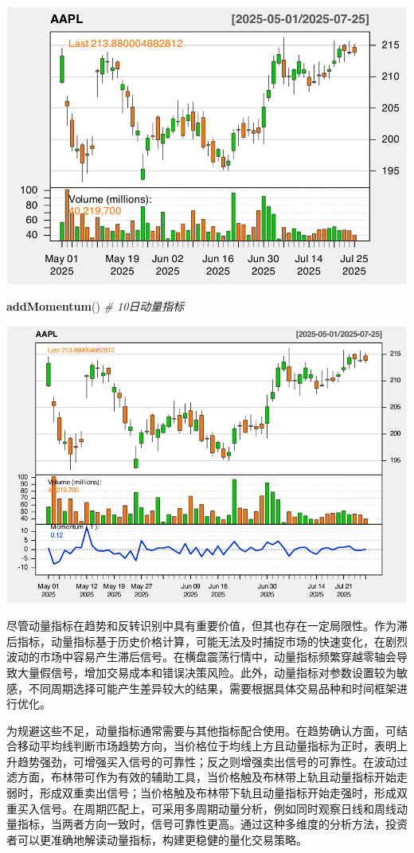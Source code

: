\documentclass[]{ctexbook}
\newenvironment{Shaded}{\begin{snugshade}}{\end{snugshade}}
\newcommand{\CommentTok}[1]{\textcolor[rgb]{0.56,0.35,0.01}{\textit{#1}}}
\newcommand{\FunctionTok}[1]{\textcolor[rgb]{0.13,0.29,0.53}{\textbf{#1}}}
\newcommand{\NormalTok}[1]{#1}
\begin{document}
\includegraphics[width=0.9\linewidth]{QuantmodHandbook_files/figure-latex/mom-1}

\begin{Shaded}
\begin{Highlighting}[]
\FunctionTok{addMomentum}\NormalTok{()  }\CommentTok{\# 10日动量指标}
\end{Highlighting}
\end{Shaded}

\includegraphics[width=0.9\linewidth]{QuantmodHandbook_files/figure-latex/mom-2}

尽管动量指标在趋势和反转识别中具有重要价值，但其也存在一定局限性。作为滞后指标，动量指标基于历史价格计算，可能无法及时捕捉市场的快速变化，在剧烈波动的市场中容易产生滞后信号。在横盘震荡行情中，动量指标频繁穿越零轴会导致大量假信号，增加交易成本和错误决策风险。此外，动量指标对参数设置较为敏感，不同周期选择可能产生差异较大的结果，需要根据具体交易品种和时间框架进行优化。

为规避这些不足，动量指标通常需要与其他指标配合使用。在趋势确认方面，可结合移动平均线判断市场趋势方向，当价格位于均线上方且动量指标为正时，表明上升趋势强劲，可增强买入信号的可靠性；反之则增强卖出信号的可靠性。在波动过滤方面，布林带可作为有效的辅助工具，当价格触及布林带上轨且动量指标开始走弱时，形成双重卖出信号；当价格触及布林带下轨且动量指标开始走强时，形成双重买入信号。在周期匹配上，可采用多周期动量分析，例如同时观察日线和周线动量指标，当两者方向一致时，信号可靠性更高。通过这种多维度的分析方法，投资者可以更准确地解读动量指标，构建更稳健的量化交易策略。
\end{document}
